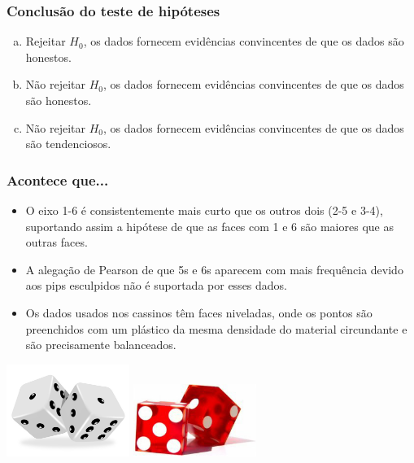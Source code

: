 
\begin{frame}
\frametitle{Conclusão do teste de hipóteses}
\justifying
{}

\begin{enumerate}[(a)]
\justifying
\item Rejeitar $H_0$, os dados fornecem evidências convincentes de que os dados são honestos.
\justifying
{}
\justifying
\item Não rejeitar $H_0$, os dados fornecem evidências convincentes de que os dados são honestos.
\justifying
\item Não rejeitar $H_0$, os dados fornecem evidências convincentes de que os dados são tendenciosos.
\end{enumerate}

\end{frame}


\begin{frame}
\frametitle{Acontece que...}

\begin{itemize}
\justifying
\item O eixo 1-6 é consistentemente mais curto que os outros dois (2-5 e 3-4), suportando assim a hipótese de que as faces com 1 e 6 são maiores que as outras faces.
\justifying
\item A alegação de Pearson de que 5s e 6s aparecem com mais frequência devido aos pips esculpidos não é suportada por esses dados.
\justifying
\item Os dados usados nos cassinos têm faces niveladas, onde os pontos são preenchidos com um plástico da mesma densidade do material circundante e são precisamente balanceados.

\end{itemize}

\begin{center}
\includegraphics[width=0.3\textwidth]{6-3_chisq_gof/regular.jpeg}
\includegraphics[width=0.3\textwidth]{6-3_chisq_gof/casino.jpeg}
\end{center}


\end{frame}


